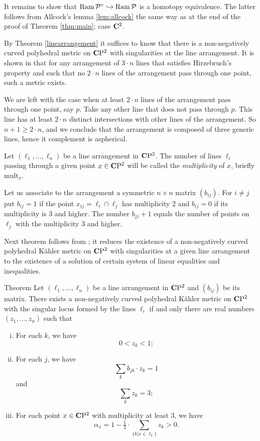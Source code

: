 \documentclass{compositio}
\begin{document}
It remains to show that $\mathop{\rm Ram}\nolimits \mathcal P^{\circ}\hookrightarrow \mathop{\rm Ram}\nolimits \mathcal P$ is a homotopy equivalence.
The latter follows from Allcock's lemma \ref{lem:allcock}
the same way as at the end of the proof of Theorem  \ref{thm:main}; case $\mathbf{C}^2$.
\qeds



 By Theorem \ref {linearrangement}
it suffices to know that there is a
non-negatively curved polyhedral metric on $\mathbf{C}\mathrm{P}^2$ with singularities
at the line arrangement. 
It is shown in \cite{panov} that for any arrangement of $3\cdot n$ lines that satisfies Hirzebruch's property and such that no $2\cdot n$ lines of the arrangement pass through one point,
such a metric exists. 

We are left with the case when at least $2\cdot n$ lines of the arrangement pass through one point, say $p$. Take any other line that does not pass through $p$. This line has at least $2\cdot n$ distinct intersections with other lines of the arrangement. So $n+1\ge 2\cdot n$, and we conclude that the arrangement is composed of three generic lines, hence it complement is aspherical.
\qeds

Let $(\ell_1,\dots,\ell_n)$ be a line arrangement in $\mathbf{C}\mathrm{P}^2$.
The number of lines $\ell_i$ passing through a given point $x\in\mathbf{C}\mathrm{P}^2$
will be called the \emph{multiplicity} of $x$, briefly
\def\mult{\mathrm{mult}}
$\mult_x$.

Let us associate to the arrangement a symmetric $n\times n$ matrix $(b_{ij})$.
For $i\ne j$
put $b_{ij}=1$ if the point $x_{ij}= \ell_i\cap \ell_j$
has multiplicity $2$
and $b_{ij}=0$ if its multiplicity is $3$ and higher.
The number $b_{jj}+1$ equals the number of points on $\ell_j$ with the multiplicity $3$ and higher.

Next theorem follows from \cite[Theorem 1.12, Lemma 7.9]{panov};
it reduces the existence of a non-negatively curved polyhedral K\"ahler metric on $\mathbf{C}\mathrm{P}^2$
with singularities at a given
line arrangement to the existence of a solution of certain system of linear equalities and inequalities.

\begin{thm}{Theorem}\label{general} Let $(\ell_1,\dots,\ell_n)$ be a line arrangement in $\mathbf{C}\mathrm{P}^2$ and $(b_{ij})$ be its matrix.
There exists a non-negatively curved polyhedral K\"ahler metric on $\mathbf{C}\mathrm{P}^2$
with the singular locus formed by the lines $\ell_i$
if and only there are real numbers $(z_1,\dots,z_n)$
such that
\begin{enumerate}[(i)]
\item \label{general:i}For each $k$, we have
\[0<z_k<1;\]
\item \label{general:ii}For each $j$, we have
\[\sum_{k} b_{jk}\cdot z_k=1\]
and \[\sum_{k} z_k=3;\]
\item\label{general:iv} For each point $x\in\mathbf{C}\mathrm{P}^2$ with multiplicity at least 3, we have%
\[\alpha_x=1-\tfrac{1}{2}\cdot\sum_{\{k|x\in \ell_k\}}z_k>0.\]
\end{enumerate}
\end{thm}
\end{document}
